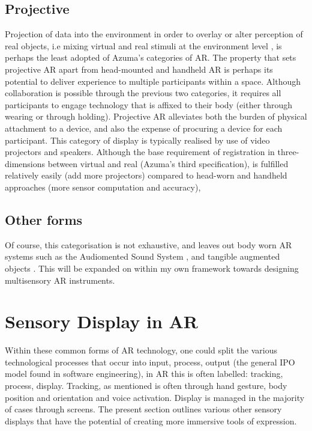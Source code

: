 \subsection{Projective}\label{sec: ar-forms-proj}
Projection of data into the environment in order to overlay or alter perception of real objects, i.e mixing virtual and real stimuli at the environment level \citep{lindeman2007}, is perhaps the least adopted of Azuma's categories of AR. The property that sets projective AR apart from head-mounted and handheld AR is perhaps its potential to deliver experience to multiple participants within a space. Although collaboration is possible through the previous two categories, it requires all participants to engage technology that is affixed to their body (either through wearing or through holding). Projective AR alleviates both the burden of physical attachment to a device, and also the expense of procuring a device for each participant. This category of display is typically realised by use of video projectors and speakers. Although the base requirement of registration in three-dimensions between virtual and real (Azuma's third specification), is fulfilled relatively easily (add more projectors) compared to head-worn and handheld approaches (more sensor computation and accuracy), 

\subsection{Other forms}\label{sec: ar-forms-other}
Of course, this categorisation is not exhaustive, and leaves out body worn AR systems such as the Audiomented Sound System \citep{chevalier2020}, and tangible augmented objects \citep{schraffenberger2015}. This will be expanded on within my own framework towards designing multisensory AR instruments.



\section{Sensory Display in AR}\label{sec: ar-sensory}
Within these common forms of AR technology, one could split the various technological processes that occur into input, process, output (the general IPO model found in software engineering), in AR this is often labelled: tracking, process, display. Tracking, as mentioned is often through hand gesture, body position and orientation and voice activation. Display is managed in the majority of cases through screens. The present section outlines various other sensory displays that have the potential of creating more immersive tools of expression.

